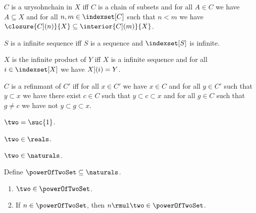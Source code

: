 \begin{definition}\label{urysohnchain_without_cardinality}
    $C$ is a urysohnchain in $X$ iff
    $C$ is a chain of subsets and
    for all $A \in C$ we have $A \subseteq X$ and
    for all $n,m \in \indexset[C]$ such that $n < m$ we have $\closure{\index[C](n)}{X} \subseteq \interior{\index[C](m)}{X}$.
\end{definition}

\begin{abbreviation}\label{infinte_sequence}
    $S$ is a infinite sequence iff $S$ is a sequence and $\indexset[S]$ is infinite.
\end{abbreviation}

\begin{definition}\label{infinite_product}
    $X$ is the infinite product of $Y$ iff
    $X$ is a infinite sequence and for all $i \in \indexset[X]$ we have $\index[X](i) = Y$.
\end{definition}

\begin{definition}\label{refinmant}
    $C$ is a refinmant of $C'$ iff for all $x \in C'$ we have $x \in C$ and 
    for all $y \in C'$ such that $y \subset x$ we have there exist $c \in C$ such that $y \subset c \subset x$
    and for all $g \in C$ such that $g \neq c$ we have not $y \subset g \subset x$.
\end{definition}

\begin{abbreviation}\label{two}
    $\two = \suc{1}$.
\end{abbreviation}

\begin{lemma}\label{two_in_reals}
    $\two \in \reals$.
\end{lemma}

\begin{lemma}\label{two_in_naturals}
    $\two \in \naturals$.
\end{lemma}

\begin{inductive}\label{power_of_two}
    Define $\powerOfTwoSet \subseteq \naturals$.
    \begin{enumerate}
        \item  $\two \in \powerOfTwoSet$.
        \item  If $n \in \powerOfTwoSet$, then $n \rmul \two \in \powerOfTwoSet$.
    \end{enumerate}

\end{inductive}

